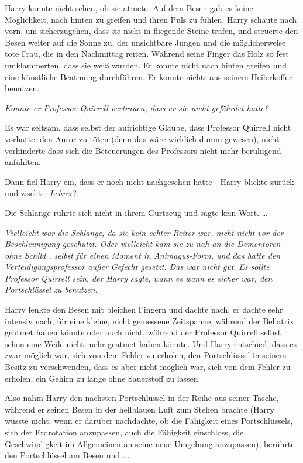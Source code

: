 Harry konnte nicht sehen, ob sie atmete. Auf dem Besen gab es keine Möglichkeit,
nach hinten zu greifen und ihren Puls zu fühlen. Harry schaute nach vorn, um
sicherzugehen, dass sie nicht in fliegende Steine trafen, und steuerte den Besen
weiter auf die Sonne zu, der unsichtbare Jungen und die möglicherweise tote
Frau, die in den Nachmittag reiten. Während seine Finger das Holz so fest
umklammerten, dass sie weiß wurden. Er konnte nicht nach hinten greifen und eine
künstliche Beatmung durchführen. Er konnte nichts aus seinem Heilerkoffer
benutzen.

\emph{Konnte er Professor Quirrell vertrauen, dass er sie nicht gefährdet
hatte?}

Es war seltsam, dass selbst der aufrichtige Glaube, dass Professor Quirrell
nicht vorhatte, den Auror zu töten (denn das wäre wirklich dumm gewesen), nicht
verhinderte dass sich die Beteuerungen des Professors nicht mehr beruhigend
anfühlten.

Dann fiel Harry ein, dass er noch nicht nachgesehen hatte - Harry blickte zurück
und zischte: \glqq{}\emph{Lehrer}?\grqq{}.

Die Schlange rührte sich nicht in ihrem Gurtzeug und sagte kein Wort. …

\emph{Vielleicht war die Schlange, da sie kein echter Reiter war, nicht nicht
vor der Beschleunigung geschützt. Oder vielleicht kam sie zu nah an die
Dementoren ohne Schild , selbst für einen Moment in Animagus-Form, und das hatte
den Verteidigungsprofessor außer Gefecht gesetzt. Das war nicht gut}. \emph{Es
sollte Professor Quirrell sein, der Harry sagte, wann es wann es sicher war, den
Portschlüssel zu benutzen.}

Harry lenkte den Besen mit bleichen Fingern und dachte nach, er dachte sehr
intensiv nach, für eine kleine, nicht gemessene Zeitspanne, während der
Bellatrix geatmet haben könnte oder auch nicht, während der Professor Quirrell
selbst schon eine Weile nicht mehr geatmet haben könnte. Und Harry entschied,
dass es zwar möglich war, sich von dem Fehler zu erholen, den Portschlüssel in
seinem Besitz zu verschwenden, dass es aber nicht möglich war, sich von dem
Fehler zu erholen, ein Gehirn zu lange ohne Sauerstoff zu lassen.

Also nahm Harry den nächsten Portschlüssel in der Reihe aus seiner Tasche,
während er seinen Besen in der hellblauen Luft zum Stehen brachte (Harry wusste
nicht, wenn er darüber nachdachte, ob die Fähigkeit eines Portschlüssels, sich
der Erdrotation anzupassen, auch die Fähigkeit einschloss, die Geschwindigkeit
im Allgemeinen an seine neue Umgebung anzupassen), berührte den Portschlüssel am
Besen und ...

